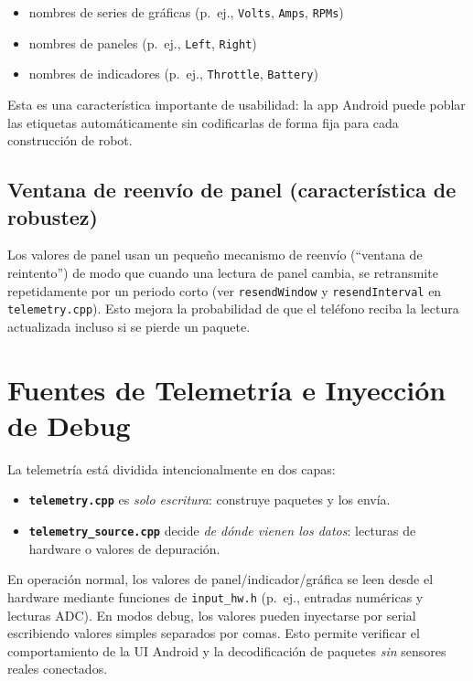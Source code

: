 \begin{itemize}
    \item nombres de series de gráficas (p.\ ej., \texttt{Volts}, \texttt{Amps}, \texttt{RPMs})
    \item nombres de paneles (p.\ ej., \texttt{Left}, \texttt{Right})
    \item nombres de indicadores (p.\ ej., \texttt{Throttle}, \texttt{Battery})
\end{itemize}

Esta es una característica importante de usabilidad: la app Android puede poblar las etiquetas automáticamente sin
codificarlas de forma fija para cada construcción de robot.

\subsection{Ventana de reenvío de panel (característica de robustez)}
Los valores de panel usan un pequeño mecanismo de reenvío (``ventana de reintento'') de modo que cuando una lectura de panel cambia,
se retransmite repetidamente por un periodo corto (ver \texttt{resendWindow} y \texttt{resendInterval} en
\texttt{telemetry.cpp}). Esto mejora la probabilidad de que el teléfono reciba la lectura actualizada incluso si se pierde un paquete.

\section{Fuentes de Telemetría e Inyección de Debug}
\label{sec:telemetry-sources}

La telemetría está dividida intencionalmente en dos capas:

\begin{itemize}
    \item \textbf{\texttt{telemetry.cpp}} es \emph{solo escritura}: construye paquetes y los envía.
    \item \textbf{\texttt{telemetry\_source.cpp}} decide \emph{de dónde vienen los datos}: lecturas de hardware o valores de depuración.
\end{itemize}

En operación normal, los valores de panel/indicador/gráfica se leen desde el hardware mediante funciones de
\texttt{input\_hw.h} (p.\ ej., entradas numéricas y lecturas ADC). En modos debug, los valores pueden inyectarse por serial
escribiendo valores simples separados por comas. Esto permite verificar el comportamiento de la UI Android y la decodificación
de paquetes \emph{sin} sensores reales conectados.

